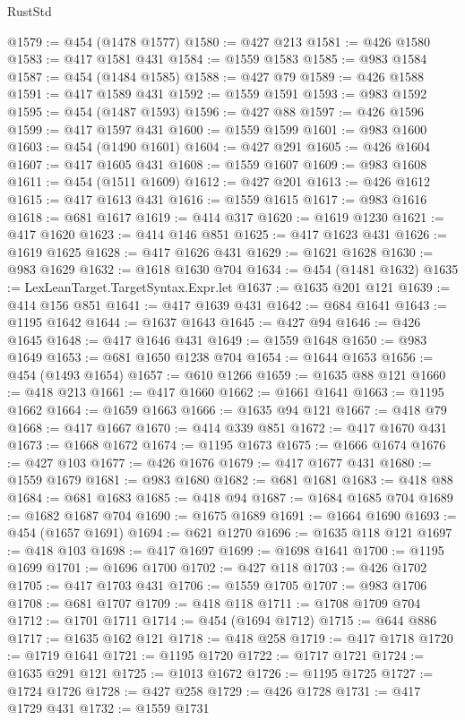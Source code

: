 \begin{lexlean}{RustStd}
\begin{coremodule}
@1579 := @454 (@1478 @1577)
@1580 := @427 @213
@1581 := @426 @1580
@1583 := @417 @1581 @431
@1584 := @1559 @1583
@1585 := @983 @1584
@1587 := @454 (@1484 @1585)
@1588 := @427 @79
@1589 := @426 @1588
@1591 := @417 @1589 @431
@1592 := @1559 @1591
@1593 := @983 @1592
@1595 := @454 (@1487 @1593)
@1596 := @427 @88
@1597 := @426 @1596
@1599 := @417 @1597 @431
@1600 := @1559 @1599
@1601 := @983 @1600
@1603 := @454 (@1490 @1601)
@1604 := @427 @291
@1605 := @426 @1604
@1607 := @417 @1605 @431
@1608 := @1559 @1607
@1609 := @983 @1608
@1611 := @454 (@1511 @1609)
@1612 := @427 @201
@1613 := @426 @1612
@1615 := @417 @1613 @431
@1616 := @1559 @1615
@1617 := @983 @1616
@1618 := @681 @1617
@1619 := @414 @317
@1620 := @1619 @1230
@1621 := @417 @1620
@1623 := @414 @146 @851
@1625 := @417 @1623 @431
@1626 := @1619 @1625
@1628 := @417 @1626 @431
@1629 := @1621 @1628
@1630 := @983 @1629
@1632 := @1618 @1630 @704
@1634 := @454 (@1481 @1632)
@1635 := LexLeanTarget.TargetSyntax.Expr.let
@1637 := @1635 @201 @121
@1639 := @414 @156 @851
@1641 := @417 @1639 @431
@1642 := @684 @1641
@1643 := @1195 @1642
@1644 := @1637 @1643
@1645 := @427 @94
@1646 := @426 @1645
@1648 := @417 @1646 @431
@1649 := @1559 @1648
@1650 := @983 @1649
@1653 := @681 @1650 @1238 @704
@1654 := @1644 @1653
@1656 := @454 (@1493 @1654)
@1657 := @610 @1266
@1659 := @1635 @88 @121
@1660 := @418 @213
@1661 := @417 @1660
@1662 := @1661 @1641
@1663 := @1195 @1662
@1664 := @1659 @1663
@1666 := @1635 @94 @121
@1667 := @418 @79
@1668 := @417 @1667
@1670 := @414 @339 @851
@1672 := @417 @1670 @431
@1673 := @1668 @1672
@1674 := @1195 @1673
@1675 := @1666 @1674
@1676 := @427 @103
@1677 := @426 @1676
@1679 := @417 @1677 @431
@1680 := @1559 @1679
@1681 := @983 @1680
@1682 := @681 @1681
@1683 := @418 @88
@1684 := @681 @1683
@1685 := @418 @94
@1687 := @1684 @1685 @704
@1689 := @1682 @1687 @704
@1690 := @1675 @1689
@1691 := @1664 @1690
@1693 := @454 (@1657 @1691)
@1694 := @621 @1270
@1696 := @1635 @118 @121
@1697 := @418 @103
@1698 := @417 @1697
@1699 := @1698 @1641
@1700 := @1195 @1699
@1701 := @1696 @1700
@1702 := @427 @118
@1703 := @426 @1702
@1705 := @417 @1703 @431
@1706 := @1559 @1705
@1707 := @983 @1706
@1708 := @681 @1707
@1709 := @418 @118
@1711 := @1708 @1709 @704
@1712 := @1701 @1711
@1714 := @454 (@1694 @1712)
@1715 := @644 @886
@1717 := @1635 @162 @121
@1718 := @418 @258
@1719 := @417 @1718
@1720 := @1719 @1641
@1721 := @1195 @1720
@1722 := @1717 @1721
@1724 := @1635 @291 @121
@1725 := @1013 @1672
@1726 := @1195 @1725
@1727 := @1724 @1726
@1728 := @427 @258
@1729 := @426 @1728
@1731 := @417 @1729 @431
@1732 := @1559 @1731

\end{coremodule}
\end{lexlean}
